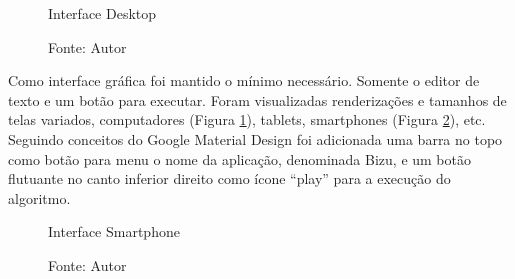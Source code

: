 \begin{figure}[h]
  \caption{Interface Desktop}\label{fig:ui-pc}
  \centering
  \setlength{\fboxsep}{0pt}%
\setlength{\fboxrule}{1pt}%
  \caption*{\footnotesize Fonte: Autor}
\end{figure}

Como interface gráfica foi mantido o mínimo necessário. Somente o editor de texto e um botão para executar. Foram visualizadas renderizações e tamanhos de telas variados, computadores (Figura \ref{fig:ui-pc}), tablets, smartphones (Figura \ref{fig:ui-phone}), etc. Seguindo conceitos do Google Material Design foi adicionada uma barra no topo como botão para menu o nome da aplicação, denominada Bizu, e um botão flutuante no canto inferior direito como ícone ``play'' para a execução do algoritmo.

\begin{figure}[h]
  \caption{Interface Smartphone}\label{fig:ui-phone}
  \centering
  \setlength{\fboxsep}{0pt}%
\setlength{\fboxrule}{1pt}%
  \caption*{\footnotesize Fonte: Autor}
\end{figure}

